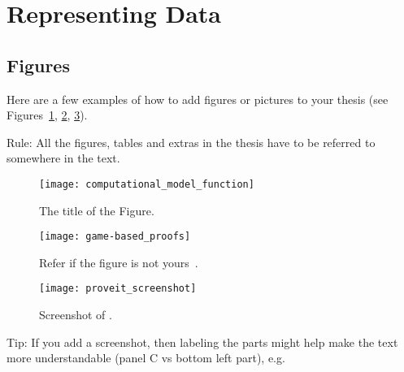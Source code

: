 \section{Representing Data}

\subsection{Figures}

Here are a few examples of how to add figures or pictures to your thesis (see Figures~\ref{fig:fnCompModel}, \ref{fig:game-based_proofs}, \ref{fig:proveit_screenshot}).

Rule: All the figures, tables and extras in the thesis have to be referred to somewhere in the text.


\begin{figure} [ht] %
\begin{center}
\texttt{[image: computational\_model\_function]}
\caption{The title of the Figure.}
\label{fig:fnCompModel}
\end{center}
\end{figure}



\begin{figure} [!ht] %
\begin{center}
\texttt{[image: game-based\_proofs]}
\caption{Refer if the figure is not yours~\cite{kamm12}.}
\label{fig:game-based_proofs}
\end{center}
\end{figure}


\begin{figure} [p]
\begin{center}
\texttt{[image: proveit\_screenshot]}
\caption{Screenshot of \proveit.}
\label{fig:proveit_screenshot}
\end{center}
\end{figure}

Tip: If you add a screenshot, then labeling the parts might help make the text more understandable (panel C vs bottom left part), e.g.


